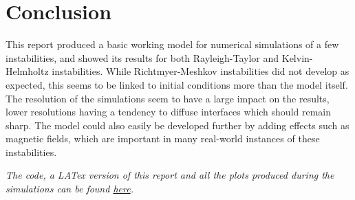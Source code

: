 \documentclass[a4paper,12pt]{article}
\begin{document}
\section{Conclusion}
\label{sec:conc}
This report produced a basic working model for numerical simulations of a few instabilities, and showed its results for both Rayleigh-Taylor and Kelvin-Helmholtz instabilities. While Richtmyer-Meshkov instabilities did not develop as expected, this seems to be linked to initial conditions more than the model itself. The resolution of the simulations seem to have a large impact on the results, lower resolutions having a tendency to diffuse interfaces which should remain sharp. The model could also easily be developed further by adding effects such as magnetic fields, which are important in many real-world instances of these instabilities.\\
\linebreak

\textit{The code, a LATex version of this report and all the plots produced during the simulations can be found \hyperref{https://github.com/AlbanSMA/CompAstro_Project3}{}{}{here}.}


\printbibliography
\end{document}
